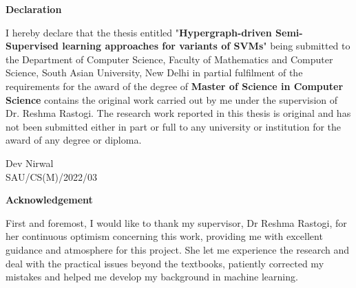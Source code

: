 \documentclass[12pt,a4paper,oneside,english]{report}
\begin{document}
\newpage
\begin{center}
	\huge{\textbf{Declaration}}\\[1.5cm]
\end{center}
I hereby declare that the thesis entitled "\textbf{Hypergraph-driven  Semi-Supervised  learning approaches for variants of SVMs}" being submitted to the Department of Computer Science, Faculty of Mathematics and Computer Science, South Asian University, New Delhi in partial fulfilment of the requirements for the award of the degree of \textbf{Master of Science in Computer Science} contains the original work carried out by me under the supervision of Dr. Reshma Rastogi. The research work reported in this thesis is original and has not been submitted either in part or full to any university or institution for the award of any degree or diploma.

\vspace{1.9cm}

\begin{flushright} 
    
	Dev Nirwal\\
	SAU/CS(M)/2022/03 
\end{flushright} 


\newpage
\begin{center}
	\huge{\textbf{Acknowledgement}}\\[1.5cm]
\end{center}


First and foremost, I would like to thank my supervisor, Dr Reshma Rastogi, for her continuous optimism concerning this work, providing me with excellent guidance and atmosphere for this project. She let me experience the research and deal with the practical issues beyond the textbooks, patiently corrected my mistakes and helped me develop my background in machine learning.
\end{document}
